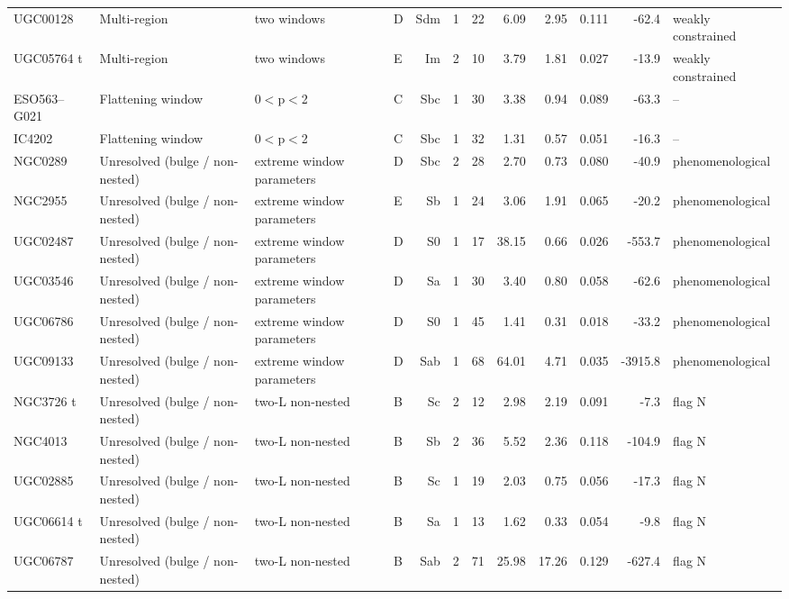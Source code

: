 \documentclass[10pt]{article}
\begin{document}
\begin{landscape}
{\begin{longtable}{llllrrrrrrrl}
UGC00128 & Multi-region & two windows & D & Sdm & 1 & 22 & 6.09 & 2.95 & 0.111 & -62.4 & weakly constrained\\
UGC05764 t & Multi-region & two windows & E & Im & 2 & 10 & 3.79 & 1.81 & 0.027 & -13.9 & weakly constrained\\
\midrule
ESO563--G021 & Flattening window & 0$<$p$<$2 & C & Sbc & 1 & 30 & 3.38 & 0.94 & 0.089 & -63.3 & --\\
IC4202 & Flattening window & 0$<$p$<$2 & C & Sbc & 1 & 32 & 1.31 & 0.57 & 0.051 & -16.3 & --\\
\midrule
NGC0289 & Unresolved (bulge / non-nested) & extreme window parameters & D & Sbc & 2 & 28 & 2.70 & 0.73 & 0.080 & -40.9 & phenomenological\\
NGC2955 & Unresolved (bulge / non-nested) & extreme window parameters & E & Sb & 1 & 24 & 3.06 & 1.91 & 0.065 & -20.2 & phenomenological\\
UGC02487 & Unresolved (bulge / non-nested) & extreme window parameters & D & S0 & 1 & 17 & 38.15 & 0.66 & 0.026 & -553.7 & phenomenological\\
UGC03546 & Unresolved (bulge / non-nested) & extreme window parameters & D & Sa & 1 & 30 & 3.40 & 0.80 & 0.058 & -62.6 & phenomenological\\
UGC06786 & Unresolved (bulge / non-nested) & extreme window parameters & D & S0 & 1 & 45 & 1.41 & 0.31 & 0.018 & -33.2 & phenomenological\\
UGC09133 & Unresolved (bulge / non-nested) & extreme window parameters & D & Sab & 1 & 68 & 64.01 & 4.71 & 0.035 & -3915.8 & phenomenological\\
NGC3726 t & Unresolved (bulge / non-nested) & two-L non-nested & B & Sc & 2 & 12 & 2.98 & 2.19 & 0.091 & -7.3 & flag N\\
NGC4013 & Unresolved (bulge / non-nested) & two-L non-nested & B & Sb & 2 & 36 & 5.52 & 2.36 & 0.118 & -104.9 & flag N\\
UGC02885 & Unresolved (bulge / non-nested) & two-L non-nested & B & Sc & 1 & 19 & 2.03 & 0.75 & 0.056 & -17.3 & flag N\\
UGC06614 t & Unresolved (bulge / non-nested) & two-L non-nested & B & Sa & 1 & 13 & 1.62 & 0.33 & 0.054 & -9.8 & flag N\\
UGC06787 & Unresolved (bulge / non-nested) & two-L non-nested & B & Sab & 2 & 71 & 25.98 & 17.26 & 0.129 & -627.4 & flag N\\
\end{longtable}}\end{landscape}
\end{document}
